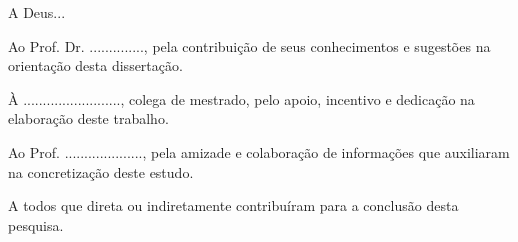 
\begin{agradecimentos}[AGRADECIMENTOS]

A Deus...

Ao Prof. Dr. .............., pela contribuição de seus conhecimentos e sugestões na orientação desta dissertação.

À ........................., colega de mestrado, pelo apoio, incentivo e dedicação na elaboração deste trabalho.

Ao Prof. ...................., pela amizade e colaboração de informações que auxiliaram na concretização deste estudo.

A todos que direta ou indiretamente contribuíram para a conclusão desta pesquisa.


\end{agradecimentos}
